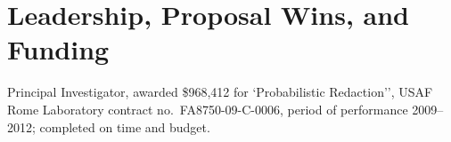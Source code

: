 \section*{Leadership, Proposal Wins, and Funding}

\vspace{-2mm}
Principal Investigator, awarded \$968,412 for `Probabilistic Redaction'',
USAF Rome Laboratory contract no.\ FA8750-09-C-0006, period of performance
2009--2012; completed on time and budget.

